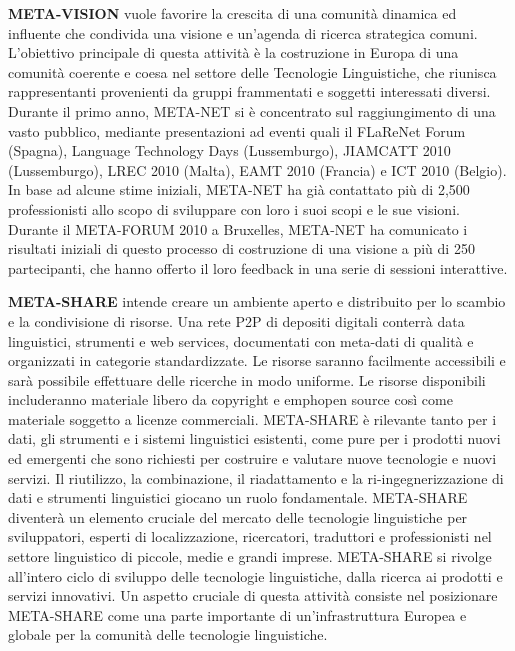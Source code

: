 \documentclass[]{../../metanetpaper}
\begin{document}
\begin{multicols}{2}
\textbf{META-VISION} vuole favorire la crescita di una comunit\`{a} dinamica ed influente che condivida una visione e un'agenda di ricerca strategica comuni. L'obiettivo principale di questa attivit\`{a} \`{e} la costruzione in Europa di una comunit\`{a} coerente e coesa nel settore delle Tecnologie Linguistiche, che riunisca rappresentanti provenienti da gruppi frammentati e soggetti interessati diversi. Durante il primo anno, META-NET si \`{e} concentrato sul raggiungimento di una vasto pubblico, mediante presentazioni ad eventi quali il FLaReNet Forum (Spagna), Language Technology Days (Lussemburgo), JIAMCATT 2010 (Lussemburgo), LREC 2010 (Malta), EAMT 2010 (Francia) e ICT 2010 (Belgio). In base ad alcune stime iniziali, META-NET ha gi\`{a} contattato pi\`{u} di 2,500 professionisti allo scopo di sviluppare con loro i suoi scopi e le sue visioni. Durante il META-FORUM 2010 a Bruxelles, META-NET ha comunicato i risultati iniziali di questo processo di costruzione di una visione a pi\`{u} di 250 partecipanti, che hanno offerto il loro feedback in una serie di sessioni interattive.



\textbf{META-SHARE} intende creare un ambiente aperto e distribuito per lo scambio e la condivisione di risorse. Una rete P2P di depositi digitali conterr\`{a} data linguistici, strumenti e web services, documentati con meta-dati di qualit\`{a} e organizzati in categorie standardizzate. Le risorse saranno facilmente accessibili e sar\`{a} possibile effettuare delle ricerche in modo uniforme. Le risorse disponibili includeranno materiale libero da copyright e emph{open source}  cos\`{i} come materiale soggetto a licenze commerciali. META-SHARE \`{e} rilevante tanto per i dati, gli strumenti e i sistemi linguistici esistenti, come pure per i prodotti nuovi ed emergenti che sono richiesti per costruire e valutare nuove tecnologie e nuovi servizi. Il riutilizzo, la combinazione, il riadattamento e la ri-ingegnerizzazione di dati e strumenti linguistici giocano un ruolo fondamentale. META-SHARE diventer\`{a} un elemento cruciale del mercato delle tecnologie linguistiche per sviluppatori, esperti di localizzazione, ricercatori, traduttori e professionisti nel settore linguistico di piccole, medie e grandi imprese. META-SHARE si rivolge all'intero ciclo di sviluppo delle tecnologie linguistiche, dalla ricerca ai prodotti e servizi innovativi. Un aspetto cruciale di questa attivit\`{a} consiste nel posizionare META-SHARE come una parte importante di un'infrastruttura Europea e globale per la comunit\`{a} delle tecnologie linguistiche.


\end{multicols}
\end{document}
